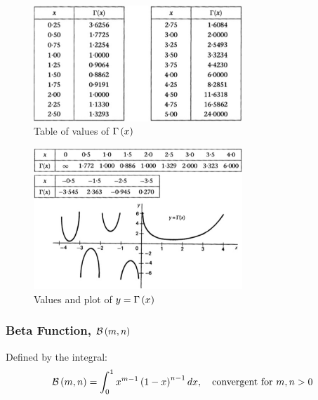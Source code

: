 \newpage
\begin{figure}[!ht]
    \centering
    \includegraphics[width=0.7\textwidth]{Images/3.1.png}
    \caption{Table of values of $\Gamma\left(x\right)$}
    \label{fig:3.1}
\end{figure}
\begin{figure}[!ht]
    \centering
    \includegraphics[width=0.7\textwidth]{Images/3.2.png}
    \caption{Values and plot of $y=\Gamma\left(x\right)$}
    \label{fig:3.2}
\end{figure}
\newpage
\subsubsection{Beta Function, $\mathcal{B}\left(m,n\right)$}
Defined by the integral:
\begin{equation}
    \mathcal{B}\left(m,n\right)=\int_{0}^{1}x^{m-1}\left(1-x\right)^{n-1}dx,\quad\text{convergent for }m,n>0
\end{equation}
